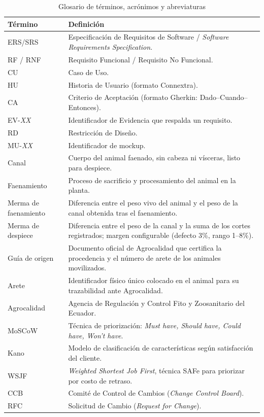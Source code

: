 \documentclass[11pt,a4paper]{article}
\begin{document}
\begin{longtable}{|p{3.5cm}|p{11cm}|}
\caption{Glosario de términos, acrónimos y abreviaturas}\\
\hline
\textbf{Término} & \textbf{Definición} \\
\hline
ERS/SRS & Especificación de Requisitos de Software / \textit{Software Requirements Specification}. \\
RF / RNF & Requisito Funcional / Requisito No Funcional. \\
CU & Caso de Uso. \\
HU & Historia de Usuario (formato Connextra). \\
CA & Criterio de Aceptación (formato Gherkin: Dado--Cuando--Entonces). \\
EV-\textit{XX} & Identificador de Evidencia que respalda un requisito. \\
RD & Restricción de Diseño. \\
MU-\textit{XX} & Identificador de mockup. \\
Canal & Cuerpo del animal faenado, sin cabeza ni vísceras, listo para despiece. \\
Faenamiento & Proceso de sacrificio y procesamiento del animal en la planta. \\
Merma de faenamiento & Diferencia entre el peso vivo del animal y el peso de la canal obtenida tras el faenamiento. \\
Merma de despiece & Diferencia entre el peso de la canal y la suma de los cortes registrados; margen configurable (defecto 3\%, rango 1--8\%). \\
Guía de origen & Documento oficial de Agrocalidad que certifica la procedencia y el número de arete de los animales movilizados. \\
Arete & Identificador físico único colocado en el animal para su trazabilidad ante Agrocalidad. \\
Agrocalidad & Agencia de Regulación y Control Fito y Zoosanitario del Ecuador. \\
MoSCoW & Técnica de priorización: \textit{Must have, Should have, Could have, Won't have}. \\
Kano & Modelo de clasificación de características según satisfacción del cliente. \\
WSJF & \textit{Weighted Shortest Job First}, técnica SAFe para priorizar por costo de retraso. \\
CCB & Comité de Control de Cambios (\textit{Change Control Board}). \\
RFC & Solicitud de Cambio (\textit{Request for Change}). \\

\end{longtable}
\end{document}
